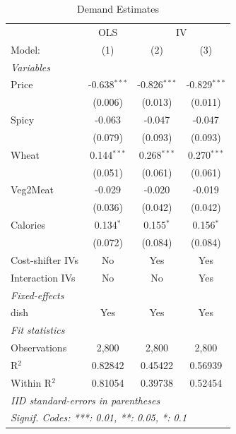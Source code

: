 
\begin{table}[H]
   \caption{\label{tab:demand} Demand Estimates}
   \centering
   \begin{tabular}{lccc}
      \tabularnewline \midrule \midrule
       & OLS & \multicolumn{2}{c}{IV} \\ 
      Model:           & (1)            & (2)            & (3)\\  
      \midrule
      \emph{Variables}\\
      Price            & -0.638$^{***}$ & -0.826$^{***}$ & -0.829$^{***}$\\   
                       & (0.006)        & (0.013)        & (0.011)\\   
      Spicy            & -0.063         & -0.047         & -0.047\\   
                       & (0.079)        & (0.093)        & (0.093)\\   
      Wheat            & 0.144$^{***}$  & 0.268$^{***}$  & 0.270$^{***}$\\   
                       & (0.051)        & (0.061)        & (0.061)\\   
      Veg2Meat         & -0.029         & -0.020         & -0.019\\   
                       & (0.036)        & (0.042)        & (0.042)\\   
      Calories         & 0.134$^{*}$    & 0.155$^{*}$    & 0.156$^{*}$\\   
                       & (0.072)        & (0.084)        & (0.084)\\   
      Cost-shifter IVs & No             & Yes            & Yes\\  
      Interaction IVs  & No             & No             & Yes\\  
      \midrule
      \emph{Fixed-effects}\\
      dish             & Yes            & Yes            & Yes\\  
      \midrule
      \emph{Fit statistics}\\
      Observations     & 2,800          & 2,800          & 2,800\\  
      R$^2$            & 0.82842        & 0.45422        & 0.56939\\  
      Within R$^2$     & 0.81054        & 0.39738        & 0.52454\\  
      \midrule \midrule
      \multicolumn{4}{l}{\emph{IID standard-errors in parentheses}}\\
      \multicolumn{4}{l}{\emph{Signif. Codes: ***: 0.01, **: 0.05, *: 0.1}}\\
   \end{tabular}
\end{table}


